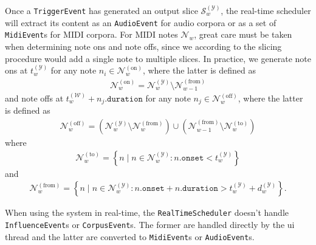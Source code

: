 Once a \texttt{TriggerEvent} has generated an output slice $\mathcal S^{(\mathcal Y)}_w$, the real-time scheduler will extract its content as an \texttt{AudioEvent} for audio corpora or as a set of \texttt{MidiEvent}s for MIDI corpora. For MIDI notes $\mathcal N_w$, great care must be taken when determining note ons and note offs, since we according to the slicing procedure would add a single note to multiple slices. In practice, we generate note ons at $t^{(\mathcal Y)}_w$ for any note $n_i \in \mathcal N^{(\text{on})}_w$, where the latter is defined as
	\begin{align}
		\mathcal N^{(\text{on})}_w = \mathcal N^{(\mathcal Y)}_w \setminus \mathcal N^{(\text{from})}_{w-1}
	\end{align}
	and note offs at $t^{(\mathcal W)}_w + n_j\texttt{.duration}$ for any note $n_j \in \mathcal N^{(\text{off})}_w$, where the latter is defined as
	\begin{align}
		\mathcal N^{(\text{off})}_w = \left(
			\mathcal N^{(\mathcal Y)}_w \setminus \mathcal N^{(\text{from})}_w \right)
			\cup
			\left( \mathcal N^{(\text{from})}_{w-1} \setminus \mathcal N^{(\text{to})}_w\right)
	\end{align}
	where
	\begin{align}
		\mathcal N^{(\text{to})}_w = \left\lbrace n \mid n \in \mathcal N^{(\mathcal Y)}_w 
			\colon n\texttt{.onset} < t^{(\mathcal Y)}_w \right\rbrace
	\end{align}
	and
	\begin{align}
		\mathcal N^{(\text{from})}_w = \left\lbrace n \mid n \in \mathcal N^{(\mathcal Y)}_w
			\colon n\texttt{.onset} + n\texttt{.duration} > t^{(\mathcal Y)}_w + d^{(\mathcal Y)}_w \right\rbrace.
	\end{align}

When using the system in real-time, the \texttt{RealTimeScheduler} doesn't handle \texttt{InfluenceEvent}s or \texttt{CorpusEvent}s. The former are handled directly by the ui thread and the latter are converted to \texttt{MidiEvent}s or \texttt{AudioEvent}s.



